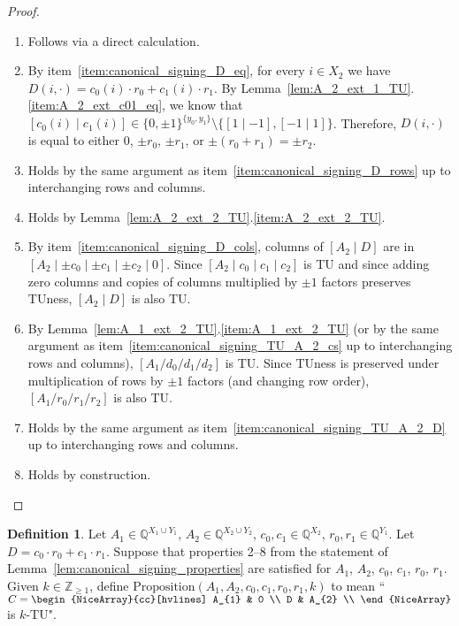 \documentclass{article}
\theoremstyle{definition}
\newtheorem{definition}{Definition}
\begin{document}
\begin{proof}
    \begin{enumerate}
        \item Follows via a direct calculation.
        \item By item~\ref{item:canonical_signing_D_eq}, for every $i \in X_{2}$ we have $D (i, \cdot) = c_{0} (i) \cdot r_{0} + c_{1} (i) \cdot r_{1}$. By Lemma~\ref{lem:A_2_ext_1_TU}.\ref{item:A_2_ext_c01_eq}, we know that $[c_{0} (i) \mid c_{1} (i)] \in \{0, \pm 1\}^{\{y_{0}, y_{1}\}} \setminus \{[1 \mid -1] , [-1 \mid 1]\}$. Therefore, $D (i, \cdot)$ is equal to either $0$, $\pm r_{0}$, $\pm r_{1}$, or $\pm (r_{0} + r_{1}) = \pm r_{2}$.
        \item Holds by the same argument as item~\ref{item:canonical_signing_D_rows} up to interchanging rows and columns.
        \item Holds by Lemma~\ref{lem:A_2_ext_2_TU}.\ref{item:A_2_ext_2_TU}.
        \item By item~\ref{item:canonical_signing_D_cols}, columns of $[A_{2} \mid D]$ are in $[A_{2} \mid \pm c_{0} \mid \pm c_{1} \mid \pm c_{2} \mid 0]$. Since $[A_{2} \mid c_{0} \mid c_{1} \mid c_{2}]$ is TU and since adding zero columns and copies of columns multiplied by $\pm 1$ factors preserves TUness, $[A_{2} \mid D]$ is also TU.
        \item By Lemma~\ref{lem:A_1_ext_2_TU}.\ref{item:A_1_ext_2_TU} (or by the same argument as item~\ref{item:canonical_signing_TU_A_2_cs} up to interchanging rows and columns), $[A_{1} / d_{0} / d_{1} / d_{2}]$ is TU. Since TUness is preserved under multiplication of rows by $\pm 1$ factors (and changing row order), $[A_{1} / r_{0} / r_{1} / r_{2}]$ is also TU.
        \item Holds by the same argument as item~\ref{item:canonical_signing_TU_A_2_D} up to interchanging rows and columns.
        \item Holds by construction.
    \end{enumerate}
\end{proof}

\begin{definition}\label{def:alt_sum_constr}
    Let $A_{1} \in \mathbb{Q}^{X_{1} \cup Y_{1}}$, $A_{2} \in \mathbb{Q}^{X_{2} \cup Y_{2}}$, $c_{0}, c_{1} \in \mathbb{Q}^{X_{2}}$, $r_{0}, r_{1} \in \mathbb{Q}^{Y_{1}}$. Let $D = c_{0} \cdot r_{0} + c_{1} \cdot r_{1}$. Suppose that properties 2--8 from the statement of Lemma~\ref{lem:canonical_signing_properties} are satisfied for $A_{1}$, $A_{2}$, $c_{0}$, $c_{1}$, $r_{0}$, $r_{1}$. Given $k \in \mathbb{Z}_{\geq 1}$, define $\mathrm{Proposition}(A_{1}, A_{2}, c_{0}, c_{1}, r_{0}, r_{1}, k)$ to mean ``$C = \begin{NiceArray}{cc}[hvlines] A_{1} & 0 \\ D & A_{2} \\ \end{NiceArray}$ is $k$-TU".
\end{definition}
\end{document}
